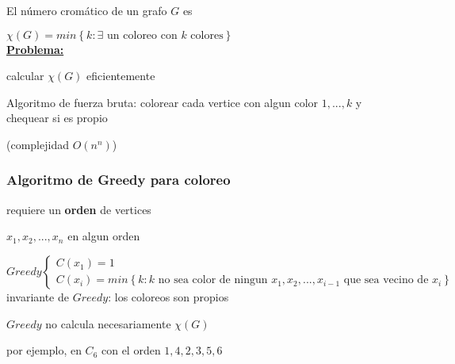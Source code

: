 \documentclass[12pt]{article}
\begin{document}
El número cromático de un grafo $G$ es

\(\chi(G) = min\left\{k : \exists \text{ un coloreo con } k \text{ colores}\right\} \) \\

\underline{\textbf{Problema:}}

calcular $\chi(G)$ eficientemente

Algoritmo de fuerza bruta: colorear cada vertice con algun color $1, ..., k$ y chequear si es propio

(complejidad $O(n^n)$) \bigskip

\subsubsection*{Algoritmo de Greedy para coloreo}

requiere un \textbf{orden} de vertices 

\(x_1, x_2, ..., x_n\) en algun orden \bigskip

\(
Greedy 
\begin{cases}
C(x_1) = 1 \\
C(x_i) = min\left\{k : k \text{ no sea color de ningun } x_1, x_2, ..., x_{i - 1} \text{ que sea vecino de } x_i\right\}
\end{cases}
\) \\

invariante de $Greedy$: los coloreos son propios \bigskip

$Greedy$ no calcula necesariamente $\chi(G)$

por ejemplo, en $C_6$ con el orden $1, 4, 2, 3, 5, 6$
\end{document}
